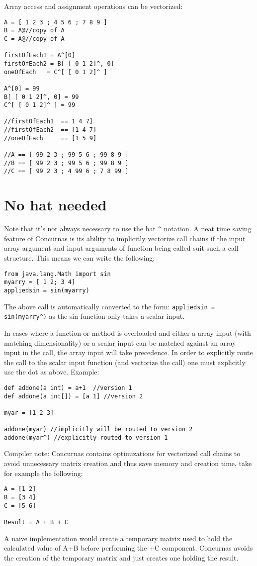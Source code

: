 \documentclass[conc-doc]{subfiles}
\begin{document}
Array access and assignment operations can be vectorized:
\begin{lstlisting}
A = [ 1 2 3 ; 4 5 6 ; 7 8 9 ]
B = A@//copy of A
C = A@//copy of A

firstOfEach1 = A^[0]
firstOfEach2 = B[ [ 0 1 2]^, 0]
oneOfEach   = C^[ [ 0 1 2]^ ]

A^[0] = 99
B[ [ 0 1 2]^, 0] = 99
C^[ [ 0 1 2]^ ] = 99

//firstOfEach1  == 1 4 7]
//firstOfEach2  == [1 4 7]
//oneOfEach 	== [1 5 9]

//A == [ 99 2 3 ; 99 5 6 ; 99 8 9 ]
//B == [ 99 2 3 ; 99 5 6 ; 99 8 9 ]
//C == [ 99 2 3 ; 4 99 6 ; 7 8 99 ]
\end{lstlisting}

\section{No hat needed}
Note that it’s not always necessary to use the hat \lstinline{^} notation. A neat time saving feature of Concurnas is its ability to implicitly vectorize call chains if the input array argument and input arguments of function being called suit such a call structure. This means we can write the following:

\begin{lstlisting}
from java.lang.Math import sin
myarry = [ 1 2; 3 4]
appliedsin = sin(myarry)
\end{lstlisting}

The above call is automatically converted to the form: \lstinline{appliedsin = sin(myarry^)} as the sin function only takes a scalar input. 

In cases where a function or method is overloaded and either a array input (with matching dimensionality) or a scalar input can be matched against an array input in the call, the array input will take precedence. In order to explicitly route the call to the scalar input function (and vectorize the call) one must explicitly use the dot as above. Example:
\begin{lstlisting}
def addone(a int) = a+1  //version 1
def addone(a int[]) = [a 1] //version 2

myar = [1 2 3]

addone(myar) //implicitly will be routed to version 2
addone(myar^) //explicitly routed to version 1
\end{lstlisting}

Compiler note: Concurnas contains optimizations for vectorized call chains to avoid unnecessary matrix creation and thus save memory and creation time, take for example the following:

\begin{lstlisting}
A = [1 2]
B = [3 4]
C = [5 6]

Result = A + B + C
\end{lstlisting}

A naive implementation would create a temporary matrix used to hold the calculated value of A+B before performing the +C component. Concurnas avoids the creation of the temporary matrix and just creates one holding the result.
\end{document}

